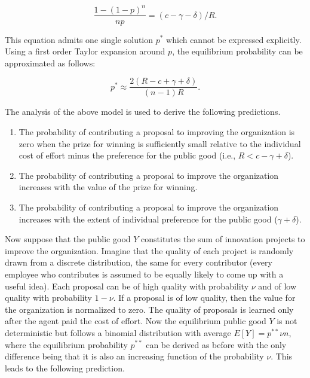 \documentclass[12pt, titlepage]{article}
\begin{document}
\begin{equation} \label{eq: mixed-strategy}
  \frac{1- (1-p)^{n}}{n p} = (c- \gamma - \delta) / R.
\end{equation}

This equation admits one single solution \(p^*\) which cannot be
expressed explicitly. Using a first order Taylor expansion around \(p\),
the equilibrium probability can be approximated as follows:

\begin{equation} \label{eq: probability}
  p^*  \approx \frac{2 (R- c+\gamma +\delta )}{(n-1) R}. 
\end{equation}

The analysis of the above model is used to derive the following
predictions.

\begin{enumerate}
\def\labelenumi{\arabic{enumi})}
\item
  The probability of contributing a proposal to improving the
  organization is zero when the prize for winning is sufficiently small
  relative to the individual cost of effort minus the preference for the
  public good (i.e., \(R< c-\gamma +\delta\)).
\item
  The probability of contributing a proposal to improve the organization
  increases with the value of the prize for winning.
\item
  The probability of contributing a proposal to improve the organization
  increases with the extent of individual preference for the public good
  (\(\gamma+\delta\)).
\end{enumerate}

Now suppose that the public good \(Y\) constitutes the sum of innovation
projects to improve the organization. Imagine that the quality of each
project is randomly drawn from a discrete distribution, the same for
every contributor (every employee who contributes is assumed to be
equally likely to come up with a useful idea). Each proposal can be of
high quality with probability \(\nu\) and of low quality with
probability \(1-\nu\). If a proposal is of low quality, then the value
for the organization is normalized to zero. The quality of proposals is
learned only after the agent paid the cost of effort. Now the
equilibrium public good \(Y\) is not deterministic but follows a
binomial distribution with average \(E[Y] = p^{**} \nu n\), where the
equilibrium probability \(p^{**}\) can be derived as before with the
only difference being that it is also an increasing function of the
probability \(\nu\). This leads to the following prediction.
\end{document}
